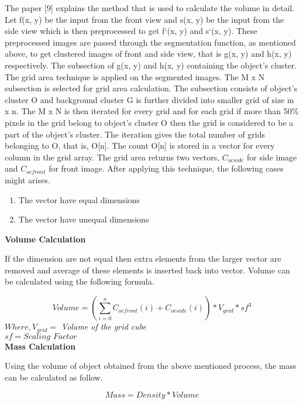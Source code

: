 The paper [9] explains the method that is used to calculate the volume in detail. Let f(x, y) be the input from the front view and s(x, y) be the input from the side view which is then preprocessed to get f`(x, y) and s`(x, y). These preprocessed images are passed through the segmentation function, as mentioned above, to get clustered images of front and side view, that is g(x, y) and h(x, y) respectively. The subsection of g(x, y) and h(x, y) containing the object’s cluster. The grid area technique is applied on the segmented images. The M x N subsection is selected for grid area calculation. The subsection consists of object’s cluster O and background cluster G is further divided into smaller grid of size m x n. The M x N is then iterated for every grid and for each grid if more than 50\% pixels in the grid belong to object’s cluster O then the grid is considered to be a part of the object’s cluster. The iteration gives the total number of grids belonging to O, that is, O[n]. The count O[n] is stored in a vector for every column in the grid array. The grid area returns two vectors, $C_{ocside}$ for side image and $C_{ocfront}$ for front image. After applying this technique, the following cases might arises. 


\begin{enumerate}
	\item The vector have equal dimensions 
	\item The vector have unequal dimensions
	
\end{enumerate}

\textbf{Volume Calculation}

If the dimension are not equal then extra elements from the larger vector are removed and average of these elements is inserted back into vector. 
Volume can be calculated using the following formula. 

\begin{equation}\label{key}
Volume = (\sum_{i=0}^{n} C_{ocfront} (i) + C_{ocside}(i)) * V_{grid} * sf^{3}
\end{equation}
$ Where,  V_{grid} =$ \textit{Volume of the grid cube}\\
$sf = \textit{Scaling Factor} $
\\

\textbf{Mass Calculation}

Using the volume of object obtained from the above mentioned process, the mass can be calculated as follow.

\begin{equation}\label{key}
Mass = Density * Volume
\end{equation}

